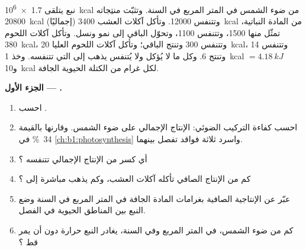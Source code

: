 \begin{problem}
\label{pb:b1:ecosystem-organization:1}
نبع يتلقى \qty{1.7e6}{kcal} من ضوء الشمس في المتر المربع في
السنة. وتثبّت منتِجاته \qty{20800}{kcal} (إجماليًا) وتتنفس
\qty{12000}{}. وتأكل آكلات العشب \qty{3400}{kcal} من المادة
النباتية، تمثّل منها \qty{1500}{}، وتتنفس \qty{1100}{}، وتحوّل
الباقي إلى نمو ونسل. وتأكل آكلات اللحوم \qty{380}{kcal}، وتتنفس
\qty{300}{} وتنتج الباقي؛ وتأكل آكلات اللحوم العليا \qty{20}{kcal}،
وتتنفس \qty{14}{} وتنتج \qty{6}{}. وكل ما لا يُؤكل ولا يُتنفس يذهب
إلى  التي تتنفسه. وخذ
\qty{1}{kcal} $= \qty{4.18}{kJ}$ و\qty{10}{kcal} لكل غرام من الكتلة
الحيوية الجافة.

\medskip
\noindent\textbf{الجزء الأول --- .}
\begin{enumerate}
  \item احسب .
  \item احسب كفاءة التركيب الضوئي: الإنتاج الإجمالي
        على ضوء الشمس. وقارنها بالقيمة \qty{34}{\%} في
        \cref{ch:b1:photosynthesis} واسرد ثلاثة فواقد
        تفصل بينهما.
  \item أي كسر من الإنتاج الإجمالي تتنفسه
        ؟
  \item كم من الإنتاج الصافي تأكله آكلات العشب، وكم
        يذهب مباشرة إلى ؟
  \item عبّر عن الإنتاجية الصافية بغرامات المادة الجافة في المتر
        المربع في السنة وضع النبع بين المناطق الحيوية في الفصل.
  \item كم من ضوء الشمس، في المتر المربع وفي السنة، يغادر
        النبع حرارة دون أن يمر قط ؟
\end{enumerate}


\end{problem}
